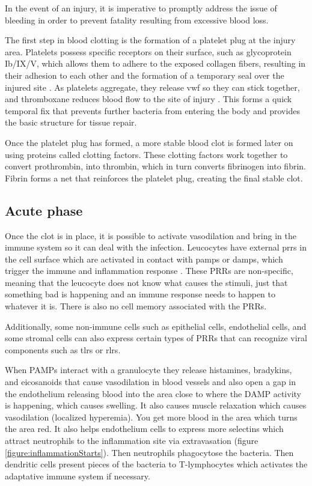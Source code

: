 In the event of an injury, it is imperative to promptly address the issue of bleeding in order to prevent fatality resulting from excessive blood loss.

The first step in blood clotting is the formation of a platelet plug at the injury area. Platelets possess specific receptors on their surface, such as glycoprotein Ib/IX/V, which allows them to adhere to the exposed collagen fibers, resulting in their adhesion to each other and the formation of a temporary seal over the injured site \cite{Li2013}. As platelets aggregate, they release \gls{vwf} so they can stick together, and thromboxane reduces blood flow to the site of injury \cite{ncbibookvmd}. This forms a quick temporal fix that prevents further bacteria from entering the body and provides the basic structure for tissue repair.

Once the platelet plug has formed, a more stable blood clot is formed later on using proteins called clotting factors. These clotting factors work together to convert prothrombin, into thrombin, which in turn converts fibrinogen into fibrin. Fibrin forms a net that reinforces the platelet plug, creating the final stable clot.

\subsection{Acute phase}

Once the clot is in place, it is possible to activate vasodilation and bring in the immune system so it can deal with the infection. Leucocytes have external \gls{prrs} in the cell surface which are activated in contact with \gls{pamps} or \gls{damps}, which trigger the immune and inflammation response \cite{Li2021}. These PRRs are non-specific, meaning that the leucocyte does not know what causes the stimuli, just that something bad is happening and an immune response needs to happen to whatever it is. There is also no cell memory associated with the PRRs.

Additionally, some non-immune cells such as epithelial cells, endothelial cells, and some stromal cells can also express certain types of PRRs that can recognize viral components such as \gls{tlrs} or \gls{rlrs}.

When PAMPs interact with a granulocyte they release histamines, bradykins, and eicosanoids that cause vasodilation in blood vessels and also open a gap in the endothelium releasing blood into the area close to where the DAMP activity is happening, which causes swelling. It also causes muscle relaxation which causes vasodilation (localized hyperemia). You get more blood in the area which turns the area red. It also helps endothelium cells to express more selectins which attract neutrophils to the inflammation site via extravasation (figure \ref{figure:inflammationStarts}). Then neutrophils phagocytose the bacteria. Then dendritic cells present pieces of the bacteria to T-lymphocytes which activates the adaptative immune system if necessary. 

